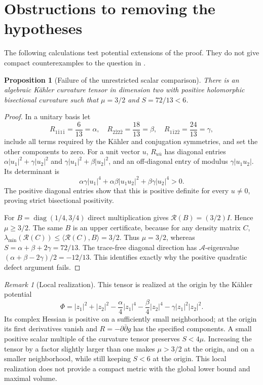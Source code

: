 \documentclass[12pt]{amsart}
\newtheorem{prop}[thm]{Proposition}
\theoremstyle{definition}
\theoremstyle{remark}
\newtheorem{rem}[thm]{Remark}
\numberwithin{equation}{section}
\theoremstyle{plain}
\theoremstyle{remark}
\theoremstyle{definition}
\begin{document}
\section{Obstructions to removing the hypotheses}\label{en:obstructions}

The following calculations test potential extensions of the proof. They
do not give compact counterexamples to the question in \cite[Section 6]{en:DS}.

\begin{prop}[Failure of the unrestricted scalar comparison]\label{en:counter}
There is an algebraic K\"ahler curvature tensor in dimension two with
positive holomorphic bisectional curvature such that
$\mu=3/2$ and $S=72/13<6$.
\end{prop}

\begin{proof}
In a unitary basis let
\[
 R_{1\bar1 1\bar1}=\frac6{13}=\alpha,\quad
 R_{2\bar2 2\bar2}=\frac{18}{13}=\beta,\quad
 R_{1\bar1 2\bar2}=\frac{24}{13}=\gamma,
\]
include all terms required by the K\"ahler and conjugation symmetries,
and set the other components to zero. For a unit vector $u$,
$R_{u\bar u}$ has diagonal entries
$\alpha|u_1|^2+\gamma|u_2|^2$ and
$\gamma|u_1|^2+\beta|u_2|^2$, and an off-diagonal entry of modulus
$\gamma|u_1u_2|$. Its determinant is
\[
 \alpha\gamma|u_1|^4+\alpha\beta|u_1u_2|^2
       +\beta\gamma|u_2|^4>0.
\]
The positive diagonal entries show that this is positive definite for
every $u\ne0$, proving strict bisectional positivity.

For $B=\operatorname{diag}(1/4,3/4)$ direct multiplication gives
$\mathscr R(B)=(3/2)I$. Hence $\mu\geq3/2$. The same $B$ is an
upper certificate, because for any density matrix $C$,
$\lambda_{\min}(\mathscr R(C))\leq\langle\mathscr R(C),B\rangle=3/2$.
Thus $\mu=3/2$, whereas
$S=\alpha+\beta+2\gamma=72/13$.
The trace-free diagonal direction has $\mathcal A$-eigenvalue
$(\alpha+\beta-2\gamma)/2=-12/13$. This identifies exactly why the
positive quadratic defect argument fails.
\end{proof}

\begin{rem}[Local realization]
This tensor is realized at the origin by the K\"ahler potential
\[
 \Phi=|z_1|^2+|z_2|^2-\frac\alpha4|z_1|^4
       -\frac\beta4|z_2|^4-\gamma|z_1|^2|z_2|^2.
\]
Its complex Hessian is positive on a sufficiently small neighborhood;
at the origin its first derivatives vanish and $R=-\partial\bar\partial g$
has the specified components. A small positive scalar multiple of the
curvature tensor preserves $S<4\mu$. Increasing the tensor by a factor
slightly larger than one makes $\mu>3/2$ at the origin, and on a smaller
neighborhood, while still keeping $S<6$ at the origin. This local
realization does not provide a compact metric with the global lower bound
and maximal volume.
\end{rem}
\end{document}
